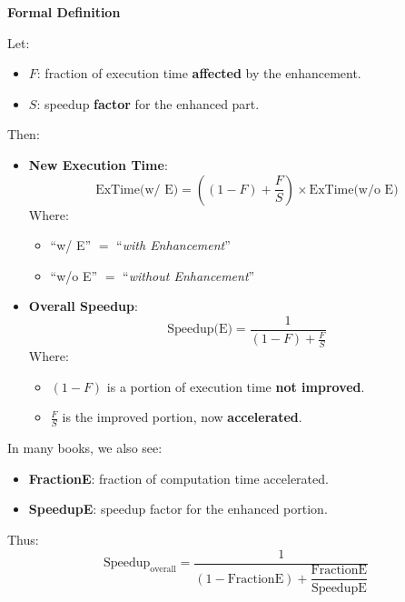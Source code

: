 \highspace
\begin{flushleft}
    \textcolor{Green3}{ \textbf{Formal Definition}}
\end{flushleft}
Let:
\begin{itemize}
    \item $F$: fraction of execution time \textbf{affected} by the enhancement.
    \item $S$: speedup \textbf{factor} for the enhanced part.
\end{itemize}
Then:
\begin{itemize}
    \item \textbf{New Execution Time}:
    \begin{equation}
        \text{ExTime(w/ E)} = \left( (1-F) + \dfrac{F}{S} \right) \times \text{ExTime(w/o E)}
    \end{equation}
    Where:
    \begin{itemize}
        \item ``w/ E'' $=$ ``\emph{with Enhancement}''
        \item ``w/o E'' $=$ ``\emph{without Enhancement}''
    \end{itemize}
    \item \textbf{Overall Speedup}:
    \begin{equation}
        \text{Speedup(E)} = \frac{1}{(1-F) + \frac{F}{S}}
    \end{equation}
    Where:
    \begin{itemize}
        \item $\left(1-F\right)$ is a portion of execution time \textbf{not improved}.
        \item $\frac{F}{S}$ is the improved portion, now \textbf{accelerated}.
    \end{itemize}
\end{itemize}
In many books, we also see:
\begin{itemize}
    \item \textbf{FractionE}: fraction of computation time accelerated.
    \item \textbf{SpeedupE}: speedup factor for the enhanced portion.
\end{itemize}
Thus:
\begin{equation}
    \text{Speedup}_{\text{overall}} = \frac{1}{(1 - \text{FractionE}) + \dfrac{\text{FractionE}}{\text{SpeedupE}}}
\end{equation}

